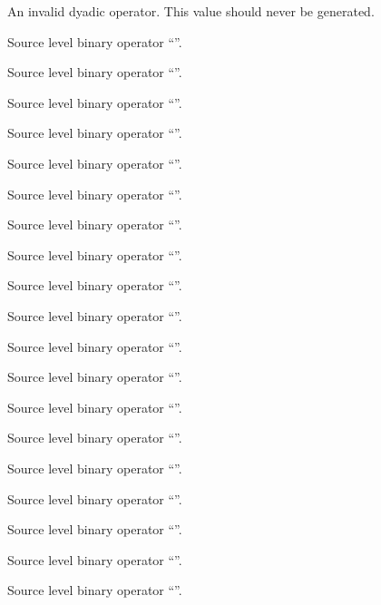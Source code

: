 An invalid dyadic operator.  This value should never be generated.

Source level binary operator ``\code{+}''.

Source level binary operator ``\code{-}''.

Source level binary operator ``\code{*}''.

Source level binary operator ``\code{/}''.

Source level binary operator ``\code{\%}''.


Source level binary operator ``\code{\&}''.

Source level binary operator ``\code{|}''.

Source level binary operator ``\code{\^}''.

Source level binary operator ``\code{<<}''.

Source level binary operator ``\code{>>}''.

Source level binary operator ``\code{==}''.

Source level binary operator ``\code{!=}''.

Source level binary operator ``\code{<}''.

Source level binary operator ``\code{<=}''.

Source level binary operator ``\code{>}''.

Source level binary operator ``\code{>=}''.

Source level binary operator ``\code{<=>}''.

Source level binary operator ``\code{\&\&}''.


Source level binary operator ``\code{||}''.

